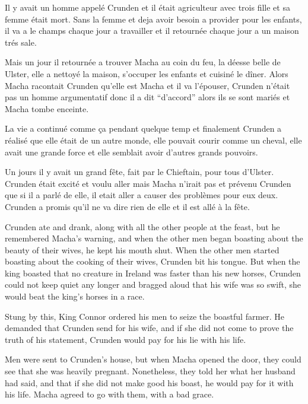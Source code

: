 \documentclass[colorlinks,12pt,a4paper,normalphoto,withhyper,ragged2e]{altareport}
\begin{document}
Il y avait un homme appelé Crunden et il était agriculteur avec trois fille et sa femme était mort. Sans la femme et deja avoir besoin a provider pour les enfants, il va a le champs chaque jour a travailler et il retournée chaque jour a un maison trés sale. \linebreak 

Mais un jour il retournée a trouver Macha au coin du feu, la déesse belle de Ulster, elle a nettoyé la maison, s'occuper les enfants et cuisiné le dîner. Alors Macha racontait Crunden qu'elle est Macha et il va l'épouser, Crunden n'était pas un homme argumentatif donc il a dit ``d'accord'' alors ils se sont mariés et Macha tombe enceinte. \linebreak

La vie a continué comme ça pendant quelque temp et finalement Crunden a réalisé que elle était de un autre monde, elle pouvait courir comme un cheval, elle avait une grande force et elle semblait avoir d’autres grands pouvoirs. \linebreak

Un jours il y avait un grand fête, fait par le Chieftain, pour tous d'Ulster. Crunden était excité et voulu aller mais Macha n’irait pas et prévenu Crunden que si il a parlé de elle, il etait aller a causer des problèmes pour eux deux. Crunden a promis qu'il ne va dire rien de elle et il est allé à la fête. \linebreak






Crunden ate and drank, along with all the other people at the feast, but he remembered Macha’s warning, and when the other men began boasting about the beauty of their wives, he kept his mouth shut. When the other men started boasting about the cooking of their wives, Crunden bit his tongue. But when the king boasted that no creature in Ireland was faster than his new horses, Crunden could not keep quiet any longer and bragged aloud that his wife was so swift, she would beat the king’s horses in a race.

Stung by this, King Connor ordered his men to seize the boastful farmer. He demanded that Crunden send for his wife, and if she did not come to prove the truth of his statement, Crunden would pay for his lie with his life.

Men were sent to Crunden’s house, but when Macha opened the door, they could see that she was heavily pregnant. Nonetheless, they told her what her husband had said, and that if she did not make good his boast, he would pay for it with his life. Macha agreed to go with them, with a bad grace.
\end{document}
